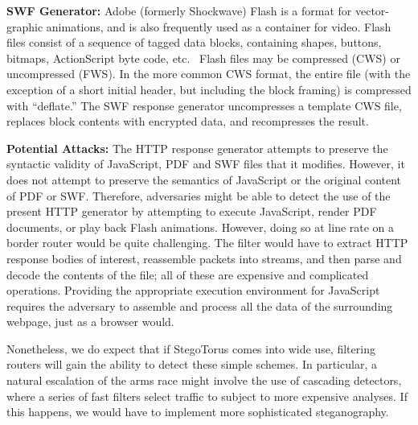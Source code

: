 \smallskip\noindent\textbf{SWF Generator:} Adobe (formerly Shockwave)
Flash is a format for vector-graphic animations, and is also
frequently used as a container for video.  Flash files consist of a
sequence of tagged data blocks, containing shapes, buttons, bitmaps,
ActionScript byte code, etc.~\cite{s-flash} Flash files may be
compressed (CWS) or uncompressed (FWS). In the more common CWS format,
the entire file (with the exception of a short initial header, but
including the block framing) is compressed with “deflate.”  The SWF
response generator uncompresses a template CWS file, replaces block
contents with encrypted data, and recompresses the result.

\smallskip\noindent\textbf{Potential Attacks:}
The HTTP response generator attempts to preserve the syntactic
validity of JavaScript, PDF and SWF files that it modifies.  However,
it does not attempt to preserve the semantics of JavaScript or the
original content of PDF or SWF.  Therefore, adversaries might be able
to detect the use of the present HTTP generator by attempting to
execute JavaScript, render PDF documents, or play back Flash
animations.  However, doing so at line rate on a border router would
be quite challenging.  The filter would have to extract HTTP response
bodies of interest, reassemble packets into streams, and then parse
and decode the contents of the file; all of these are expensive and
complicated operations.  Providing the appropriate execution
environment for JavaScript requires the adversary to assemble and
process all the data of the surrounding webpage, just as a browser
would.

Nonetheless, we do expect that if StegoTorus comes into wide use,
filtering routers will gain the ability to detect these simple
schemes.  In particular, a natural escalation of the arms race might
involve the use of cascading detectors, where a series of fast filters
select traffic to subject to more expensive analyses.  If this
happens, we would have to implement more sophisticated steganography.
